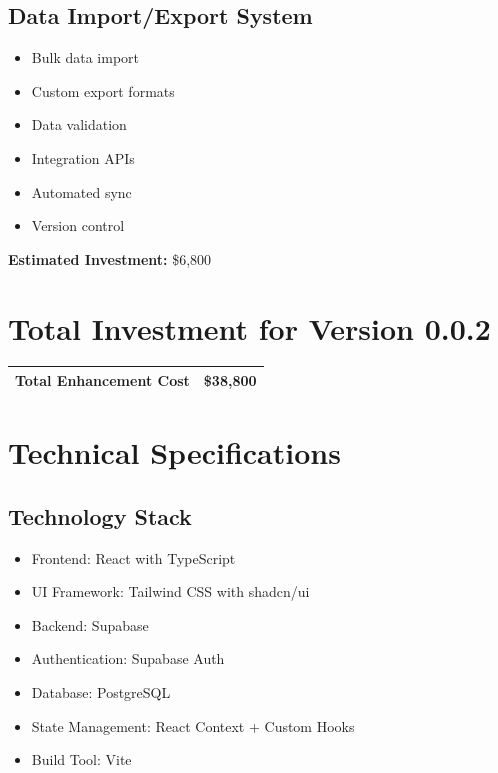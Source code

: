 \documentclass[11pt,a4paper]{article}
\begin{document}
\subsection{Data Import/Export System}
\begin{tcolorbox}[colback=white,colframe=accentPurple!20,title=Planned Features]
\begin{itemize}[leftmargin=*]
    \item Bulk data import
    \item Custom export formats
    \item Data validation
    \item Integration APIs
    \item Automated sync
    \item Version control
\end{itemize}
\textbf{Estimated Investment:} \$6,800
\end{tcolorbox}

\section{Total Investment for Version 0.0.2}
\begin{center}
\begin{tabular}{lr}
\toprule
\textbf{Total Enhancement Cost} & \textbf{\$38,800} \\
\bottomrule
\end{tabular}
\end{center}

\section{Technical Specifications}

\subsection{Technology Stack}
\begin{itemize}[leftmargin=*]
    \item Frontend: React with TypeScript
    \item UI Framework: Tailwind CSS with shadcn/ui
    \item Backend: Supabase
    \item Authentication: Supabase Auth
    \item Database: PostgreSQL
    \item State Management: React Context + Custom Hooks
    \item Build Tool: Vite
\end{itemize}
\end{document}
